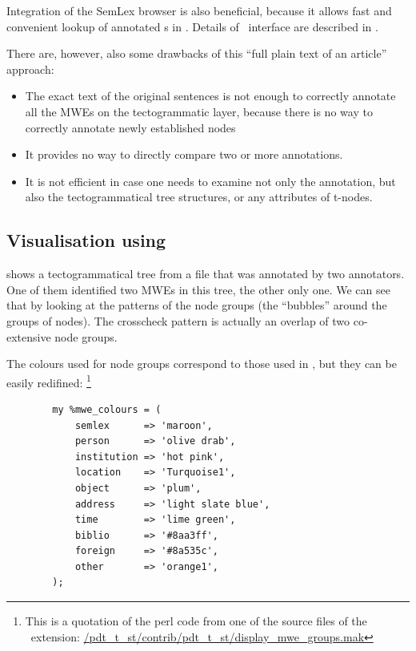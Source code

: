Integration of the SemLex browser is also beneficial, because it allows fast and convenient lookup of annotated \mwe{}s in \seman. Details of \seman\ interface are described in . 

There are, however, also some drawbacks of this ``full plain text of an article'' approach: 
\begin{itemize}
\item The exact text of the original sentences is not enough to correctly annotate all the MWEs on the tectogrammatic layer, because there is no way to correctly annotate newly established nodes \see{} \todo
\item It provides no way to directly compare two or more annotations. 
\item It is not efficient in case one needs to examine not only the annotation, but also the tectogrammatical tree structures, or any attributes of t-nodes.
\end{itemize}



\subsection{Visualisation using \tred}

 shows a tectogrammatical tree from a file that was annotated by two annotators. One of them identified two MWEs in this tree, the other only one. We can see that by looking at the patterns of the node groups (the ``bubbles'' around the groups of nodes). The crosscheck pattern is actually an overlap of two co-extensive node groups.

The colours used for node groups correspond to those used in \seman, but they can be easily redifined:%
\footnote{This is a quotation of the perl code from one of the source files of the \tred\ extension: \url{/pdt_t_st/contrib/pdt_t_st/display_mwe_groups.mak}} 
%
\begin{verbatim}
        my %mwe_colours = (
            semlex      => 'maroon',
            person      => 'olive drab',
            institution => 'hot pink',
            location    => 'Turquoise1',
            object      => 'plum',
            address     => 'light slate blue',
            time        => 'lime green',
            biblio      => '#8aa3ff',
            foreign     => '#8a535c',
            other       => 'orange1',
        );
\end{verbatim}


